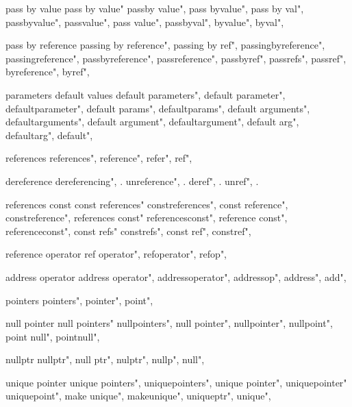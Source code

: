          pass by value
        pass by value"
        passby value",
        pass byvalue",
        pass by val",
        passbyvalue",
        passvalue",
        pass value",
        passbyval",
        byvalue",
        byval",
        
         pass by reference
        passing by reference",  
        passing by ref",  
        passingbyreference",  
        passingreference",  
        passbyreference",  
        passreference",  
        passbyref",  
        passrefs",  
        passref",  
        byreference", 
        byref", 

         parameters default values 
        default parameters",  
        default parameter",  
        defaultparameter",  
        default params",  
        defaultparams",  
        default arguments",  
        defaultarguments",  
        default argument",  
        defaultargument",  
        default arg",  
        defaultarg",  
        default",  
        
         references 
        references",  
        reference",  
        refer",  
        ref",  
        
         dereference 
        dereferencing", . 
        unreference", . 
        deref", . 
        unref", . 
        
         references const 
        const references"
        constreferences",
        const reference",
        constreference", 
        references const"
        referencesconst",
        reference const",
        referenceconst", 
        const refs"
        constrefs",
        const ref",
        constref", 
        
         reference operator 
        ref operator",
        refoperator", 
        refop",
        
         address operator 
        address operator",
        addressoperator",
        addressop",
        address",
        add",
        
         pointers
        pointers",
        pointer",
        point",
        
         null pointer
        null pointers"
        nullpointers",
        null pointer",
        nullpointer", 
        nullpoint",
        point null",
        pointnull", 
        
         nullptr
        nullptr",
        null ptr",
        nulptr",
        nullp",
        null",
        
         unique pointer
        unique pointers",
        uniquepointers", 
        unique pointer", 
        uniquepointer"
        uniquepoint", 
        make unique", 
        makeunique",
        uniqueptr",
        unique",
        
